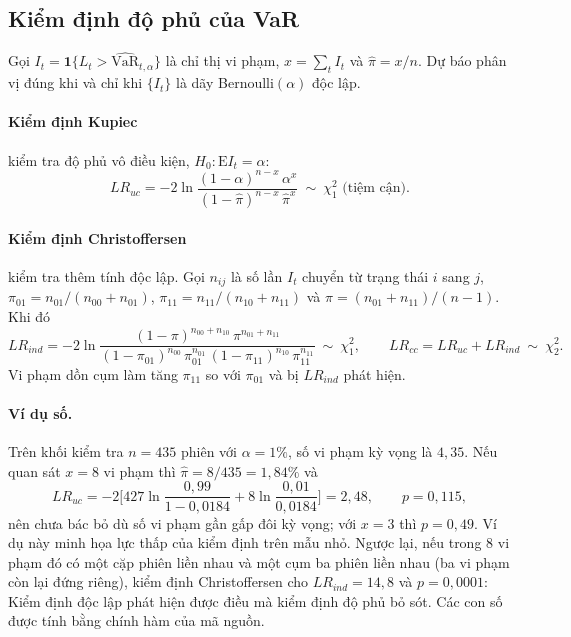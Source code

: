 \documentclass[12pt,a4paper]{article}
\theoremstyle{definition}
\theoremstyle{remark}
\newcommand{\E}{\mathrm{E}}
\newcommand{\VaR}{\mathrm{VaR}}
\newcommand{\ind}{\mathbf{1}}
\begin{document}
\subsection{Kiểm định độ phủ của VaR}

Gọi $I_t=\ind\{L_t>\widehat{\VaR}_{t,\alpha}\}$ là chỉ thị vi phạm, $x=\sum_tI_t$ và $\hat\pi=x/n$. Dự báo phân vị đúng khi và chỉ khi $\{I_t\}$ là dãy Bernoulli$(\alpha)$ độc lập.

\paragraph{Kiểm định Kupiec} \cite{kupiec1995} kiểm tra độ phủ vô điều kiện, $H_0:\E I_t=\alpha$:
\begin{equation}
LR_{uc}=-2\ln\frac{(1-\alpha)^{n-x}\,\alpha^{x}}{(1-\hat\pi)^{n-x}\,\hat\pi^{x}}\ \sim\ \chi^2_1 \text{ (tiệm cận)}.
\end{equation}

\paragraph{Kiểm định Christoffersen} \cite{christoffersen1998} kiểm tra thêm tính độc lập. Gọi $n_{ij}$ là số lần $I_t$ chuyển từ trạng thái $i$ sang $j$, $\pi_{01}=n_{01}/(n_{00}+n_{01})$, $\pi_{11}=n_{11}/(n_{10}+n_{11})$ và $\pi=(n_{01}+n_{11})/(n-1)$. Khi đó
\begin{equation}
LR_{ind}=-2\ln\frac{(1-\pi)^{n_{00}+n_{10}}\,\pi^{n_{01}+n_{11}}}{(1-\pi_{01})^{n_{00}}\,\pi_{01}^{n_{01}}\,(1-\pi_{11})^{n_{10}}\,\pi_{11}^{n_{11}}}\ \sim\ \chi^2_1,\qquad
LR_{cc}=LR_{uc}+LR_{ind}\ \sim\ \chi^2_2 .
\end{equation}
Vi phạm dồn cụm làm tăng $\pi_{11}$ so với $\pi_{01}$ và bị $LR_{ind}$ phát hiện.

\paragraph{Ví dụ số.} Trên khối kiểm tra $n=435$ phiên với $\alpha=1\%$, số vi phạm kỳ vọng là $4{,}35$. Nếu quan sát $x=8$ vi phạm thì $\hat\pi=8/435=1{,}84\%$ và
\begin{equation*}
LR_{uc}=-2\Big[427\ln\frac{0{,}99}{1-0{,}0184}+8\ln\frac{0{,}01}{0{,}0184}\Big]=2{,}48,\qquad p=0{,}115,
\end{equation*}
nên chưa bác bỏ dù số vi phạm gần gấp đôi kỳ vọng; với $x=3$ thì $p=0{,}49$. Ví dụ này minh họa lực thấp của kiểm định trên mẫu nhỏ. Ngược lại, nếu trong $8$ vi phạm đó có một cặp phiên liền nhau và một cụm ba phiên liền nhau (ba vi phạm còn lại đứng riêng), kiểm định Christoffersen cho $LR_{ind}=14{,}8$ và $p=0{,}0001$: Kiểm định độc lập phát hiện được điều mà kiểm định độ phủ bỏ sót. Các con số được tính bằng chính hàm của mã nguồn.
\end{document}
